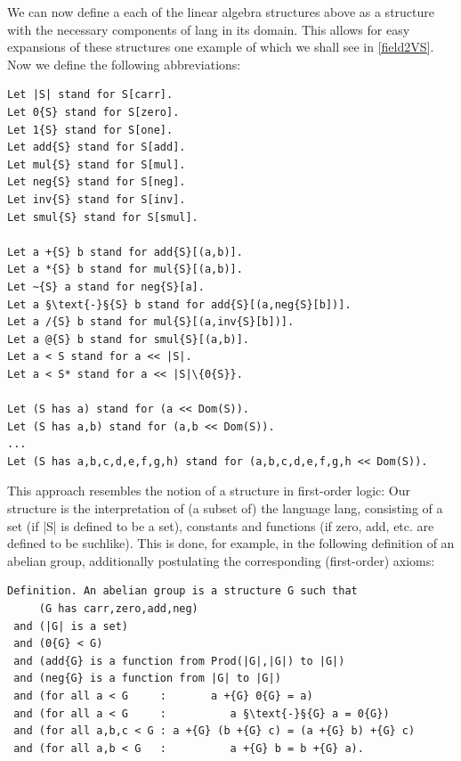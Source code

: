 \documentclass[11pt]{article}
\begin{document}
We can now define a each of the linear algebra structures above as a structure with the necessary components of {\ftl lang} in its domain. This allows for easy expansions of these structures one example of which we shall see in \ref{field2VS}. Now we define the following abbreviations:
\begin{lstlisting}
Let |S| stand for S[carr].
Let 0{S} stand for S[zero].
Let 1{S} stand for S[one].
Let add{S} stand for S[add].
Let mul{S} stand for S[mul].
Let neg{S} stand for S[neg].
Let inv{S} stand for S[inv].
Let smul{S} stand for S[smul].

Let a +{S} b stand for add{S}[(a,b)].
Let a *{S} b stand for mul{S}[(a,b)].
Let ~{S} a stand for neg{S}[a].
Let a §\text{-}§{S} b stand for add{S}[(a,neg{S}[b])].
Let a /{S} b stand for mul{S}[(a,inv{S}[b])].
Let a @{S} b stand for smul{S}[(a,b)].
Let a < S stand for a << |S|.
Let a < S* stand for a << |S|\{0{S}}.

Let (S has a) stand for (a << Dom(S)).
Let (S has a,b) stand for (a,b << Dom(S)).
...
Let (S has a,b,c,d,e,f,g,h) stand for (a,b,c,d,e,f,g,h << Dom(S)).
\end{lstlisting}

This approach resembles the notion of a structure in first-order logic: Our {\ftl structure} is the interpretation of (a subset of) the language {\ftl lang}, consisting of a set (if {\ftl |S|} is defined to be a set), constants and functions (if {\ftl zero}, {\ftl add}, etc. are defined to be suchlike).
This is done, for example, in the following definition of an abelian group, additionally postulating the corresponding (first-order) axioms:
\begin{lstlisting}
Definition. An abelian group is a structure G such that
     (G has carr,zero,add,neg)
 and (|G| is a set)
 and (0{G} < G)
 and (add{G} is a function from Prod(|G|,|G|) to |G|)
 and (neg{G} is a function from |G| to |G|)
 and (for all a < G     :       a +{G} 0{G} = a)
 and (for all a < G     :          a §\text{-}§{G} a = 0{G})
 and (for all a,b,c < G : a +{G} (b +{G} c) = (a +{G} b) +{G} c)
 and (for all a,b < G   :          a +{G} b = b +{G} a). 
\end{lstlisting}
\end{document}
